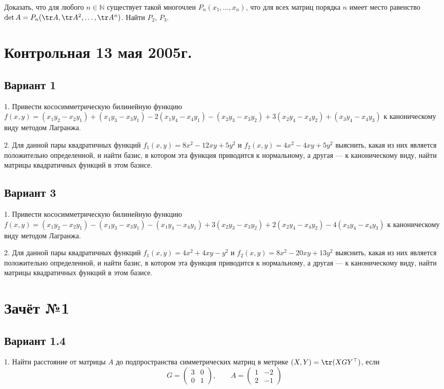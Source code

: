 \documentclass[a4paper]{article}
\def\No{№}
\begin{document}
Доказать, что для любого $n\in \mathbb{N}$ существует такой
многочлен $P_n(x_1, \ldots, x_n)$, что для всех матриц порядка $n$
имеет место равенство $\det A=P_n(\tr A, \tr A^2,\ldots, \tr
A^n)$. Найти $P_2$, $P_3$.

\section{Контрольная 13 мая 2005г.}

\subsection{Вариант 1}

1. Привести кососимметрическую билинейную функцию $f(x,
y)=(x_1y_2-x_2y_1)+(x_1y_3-x_3y_1)-2(x_1y_4-x_4y_1)-(x_2y_3-x_3y_2)+3(x_2y_4-x_4y_2)+(x_3y_4-x_4y_3)$
к каноническому виду методом Лагранжа.

2. Для данной пары квадратичных функций $f_1(x, y)=8x^2-12xy+5y^2$
и $f_2(x, y)=4x^2-4xy+5y^2$ выяснить, какая из них является
положительно определенной, и найти базис, в котором эта функция
приводится к нормальному, а другая
--- к каноническому виду, найти матрицы квадратичных функций в
этом базисе.

\subsection{Вариант 3}

1. Привести кососимметрическую билинейную функцию $f(x,
y)=(x_1y_2-x_2y_1)-(x_1y_3-x_3y_1)-(x_1y_4-x_4y_1)+3(x_2y_3-x_3y_2)+2(x_2y_4-x_4y_2)-4(x_3y_4-x_4y_3)$
к каноническому виду методом Лагранжа.

2. Для данной пары квадратичных функций $f_1(x, y)=4x^2+4xy-y^2$ и
$f_2(x, y)=8x^2-20xy+13y^2$ выяснить, какая из них является
положительно определенной, и найти базис, в котором эта функция
приводится к нормальному, а другая
--- к каноническому виду, найти матрицы квадратичных функций в
этом базисе.

\section{Зачёт \No 1}

\subsection{Вариант 1.4}

1. Найти расстояние от матрицы $A$ до подпространства
симметрических матриц в мет\-ри\-ке $(X, Y)=\tr (XGY^\top)$, если
$$
G=\left(\begin{array}{rr} 3 & 0\\
0 & 1
\end{array}\right) ,\qquad
A=\left(
\begin{array}{rr} 1 & -2\\
2 & -1
\end{array}\right)
$$
\end{document}
